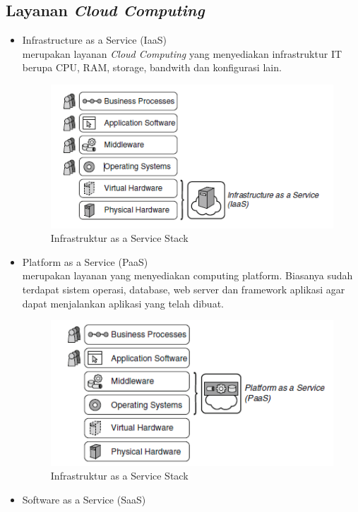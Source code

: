 \subsection{Layanan \textit{Cloud Computing}}
\label{subsec:pengertianlayanancloud}
\begin{itemize}
	\item Infrastructure as a Service (IaaS)\\
	merupakan layanan \textit{Cloud Computing} yang menyediakan infrastruktur IT berupa CPU, RAM, storage, bandwith dan konfigurasi lain.
	\begin{figure}[h]
		\centering
			\includegraphics{Gambar/iaas-infrastruktur}
		\caption{Infrastruktur as a Service Stack}
		\label{fig:iaas-infrastruktur}
	\end{figure}
	\item Platform as a Service (PaaS)\\
	merupakan layanan yang menyediakan computing platform. Biasanya sudah terdapat sistem operasi, database, web server dan framework aplikasi agar dapat menjalankan aplikasi yang telah dibuat.
	\begin{figure}[h]
		\centering
			\includegraphics{Gambar/paas-infrastruktur}
		\caption{Infrastruktur as a Service Stack}
		\label{fig:paas-infrastruktur}
	\end{figure}
	\item Software as a Service (SaaS)\\

\end{itemize}
